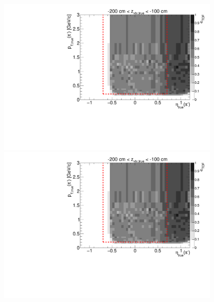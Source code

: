 \begin{figure}[hb]
{  \includegraphics[width=\linewidth,page=16]{graphics/eff/Eff2D_TOF_pion_Minus.pdf}\\
  \includegraphics[width=\linewidth,page=18]{graphics/eff/Eff2D_TOF_pion_Minus.pdf}
}%
\end{figure}

